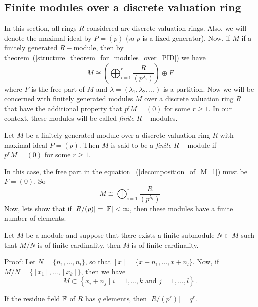 \subsection{Finite modules over a discrete valuation ring}
In this section, all rings $R$ considered are discrete valuation rings. Also, we will denote the maximal ideal by $P=(p)$ (so $p$ is a fixed generator). Now, if $M$ if a finitely generated $R-$module, then by theorem~(\ref{structure_theorem_for_modules_over_PID}) we have
\begin{equation}\label{decomposition_of_M_1}
    M\cong\left(\bigoplus_{i=1}^r\frac{R}{(p^{\lambda_i})}\right)\oplus F
\end{equation}
where $F$ is the free part of $M$ and $\lambda=(\lambda_1,\lambda_2,\dots)$ is a partition. Now we will be concerned with finitely generated modules $M$ over a discrete valuation ring $R$ that have the additional property that $p^rM=(0)$ for some $r\geq1$. In our context, these modules will be called \textit{finite} $R-$modules.
\begin{dang}
    \begin{definition}
        Let $M$ be a finitely generated module over a discrete valuation ring $R$ with maximal ideal $P=(p)$. Then $M$ is said to be a \textit{finite} $R-$module if $p^rM=(0)$ for some $r\geq1$. 
    \end{definition}
\end{dang}
In this case, the free part in the equation ~(\ref{decomposition_of_M_1}) must be $F=(0)$. So
\begin{equation}\label{decomposition_of_M_2}
     M\cong\bigoplus_{i=1}^r\frac{R}{(p^{\lambda_i})}
\end{equation}
Now, lets show that if $|R/(p)|=|\mathbb{F}|<\infty$, then these modules have a finite number of elements. 
\begin{dang}
    \begin{lemma}\label{quotient_of_finite_modules}
        Let $M$ be a module and suppose that there exists a finite submodule $N\subset M$ such that $M/N$ is of finite cardinality, then $M$ is of finite cardinality.
    \end{lemma}
\end{dang}
Proof: Let $N = \{n_1, \dots, n_l\}$, so that $[x] = \{x + n_1, \dots, x + n_l\}$. Now, if $M/N = \{[x_1], \dots, [x_k]\}$, then we have
\[
    M \subset \left\{ x_i + n_j \mid i = 1, \dots, k \text{ and } j = 1, \dots, l \right\}.
\]
\begin{dang}
\begin{theorem}
    If the residue field $\mathbb{F}$ of $R$ has $q$ elements, then $|R/(p^r)|=q^r$.
\end{theorem}
\end{dang}
